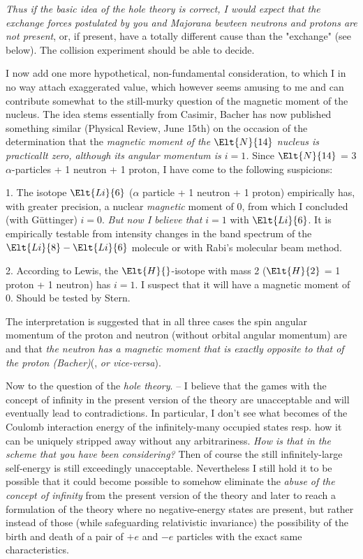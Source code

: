 \documentclass{article}
\begin{document}
\textit{Thus if the basic idea of the hole theory is correct, I would expect that the exchange forces postulated by you and Majorana bewteen neutrons and protons are not present}, or, if present, have a totally different cause than the "exchange" (see below). The collision experiment should be able to decide.

I now add one more hypothetical, non-fundamental consideration, to which I in no way attach exaggerated value, which however seems amusing to me and can contribute somewhat to the still-murky question of the magnetic moment of the nucleus. The idea stems essentially from Casimir, Bacher has now published something similar (Physical Review, June 15th) on the occasion of the determination that the \textit{magnetic moment of the $\Elt{N}{14}$ nucleus is practicallt zero, although its angular momentum is $i=1$.} Since $\Elt{N}{14}$ = 3 $\alpha$-particles + 1 neutron + 1 proton, I have come to the following suspicions:

1. The isotope $\Elt{Li}{6}$ ($\alpha$ particle + 1 neutron + 1 proton) empirically has, with greater precision, a nuclear \textit{magnetic} moment of 0, from which I concluded (with G\"uttinger) $i=0$. \textit{But now I believe that $i=1$} with $\Elt{Li}{6}$. It is empirically testable from intensity changes in the band spectrum of the $\Elt{Li}{8}-\Elt{Li}{6}$ molecule or with Rabi's molecular beam method.

2. According to Lewis, the $\Elt{H}{}$-isotope with mass 2 ($\Elt{H}{2}$ = 1 proton + 1 neutron) has $i=1$. I suspect that it will have a magnetic moment of 0. Should be tested by Stern.

The interpretation is suggested that in all three cases the spin angular momentum of the proton and neutron (without orbital angular momentum) are  and that \textit{the neutron has a magnetic moment that is exactly opposite to that of the proton (Bacher)}(, \textit{or vice-versa}).

Now to the question of the \textit{hole theory}. -- I believe that the games with the concept of infinity in the present version of the theory are unacceptable and will eventually lead to contradictions. In particular, I don't see
what becomes of the Coulomb interaction energy of the infinitely-many occupied states resp. how it can be uniquely stripped away without any arbitrariness. \textit{How is that  in the scheme that you have been considering?} Then of course the still infinitely-large self-energy is still exceedingly unacceptable. Nevertheless I still hold it to be possible that it could become possible to somehow eliminate the \textit{abuse of the concept of infinity} from the present version of the theory and later to reach a formulation of the theory where no negative-energy states are present, but rather instead of those (while safeguarding relativistic invariance) the possibility of the birth and death of a pair of $+e$ and $-e$ particles with the exact same characteristics.
\end{document}
